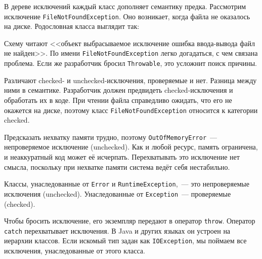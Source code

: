 В дереве исключений каждый класс дополняет семантику предка. Рассмотрим
исключение \verb|FileNotFoundException|. Оно возникает, когда файла не
оказалось на диске. Родословная класса выглядит так:

\ifafive\vspace{3mm}\fi

\linegap

\ifnarrow


\else


\fi

\linegap

Схему читают <<объект \arr выбрасываемое \arr исключение \arr ошибка
ввода-вывода \arr файл не найден>>. По имени \texttt{File\-Not\-Found\-Excep\-tion}
легко догадаться, с чем связана проблема. Если же разработчик бросил
\verb|Throwable|, это усложнит поиск причины.

Различают checked- и unchecked-исключения, проверяемые и нет. Разница между ними
в семантике. Разработчик должен предвидеть checked-исключения и обработать их в
коде. При чтении файла справедливо ожидать, что его не окажется на диске,
поэтому класс \verb|FileNotFoundException| относится к категории checked.

\label{exc-hierarchy}

Предсказать нехватку памяти трудно, поэтому \texttt{Out\-Of\-Memory\-Error}~---
непроверяемое исключение (unchecked). Как и любой ресурс, память ограничена, и
неаккуратный код может её исчерпать. Перехватывать это исключение нет смысла,
поскольку при нехватке памяти система ведёт себя нестабильно.


Классы, унаследованные от \verb|Error| и \texttt{Runtime\-Exception},~--- это
непроверяемые исключения (unchecked). Унаследованные от \verb|Exception|~---
проверяемые (checked).


Чтобы бросить исключение, его экземпляр передают в оператор
\verb|throw|. Оператор \verb|catch| перехватывает исключения. В Java и других
языках он устроен на иерархии классов. Если искомый тип задан как
\verb|IOException|, мы поймаем все исключения, унаследованные от этого класса.

